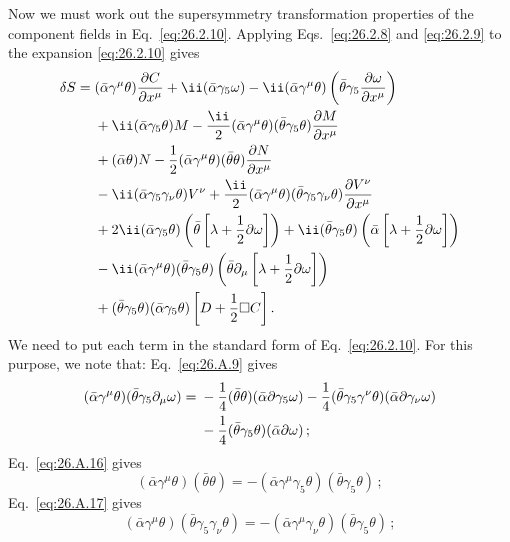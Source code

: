 Now we must work out the supersymmetry transformation properties of the
component fields in Eq.~\eqref{eq:26.2.10}. Applying Eqs.~\eqref{eq:26.2.8}
and \eqref{eq:26.2.9} to the expansion \eqref{eq:26.2.10} gives
\[
  \begin{aligned}
  \delta S={}&(\bar\alpha\gamma^\mu\theta)\frac{\partial C}{\partial x^\mu}
  +\ii(\bar\alpha\gamma_5\omega)
  -\ii(\bar\alpha\gamma^\mu\theta)
    \left(\bar\theta\gamma_5\frac{\partial\omega}{\partial x^\mu}\right)\\
  &+\ii(\bar\alpha\gamma_5\theta)M
  -\frac{\ii}{2}(\bar\alpha\gamma^\mu\theta)(\bar\theta\gamma_5\theta)
    \frac{\partial M}{\partial x^\mu}\\
  &+(\bar\alpha\theta)N
  -\frac{1}{2}(\bar\alpha\gamma^\mu\theta)(\bar\theta\theta)
    \frac{\partial N}{\partial x^\mu}\\
  &-\ii(\bar\alpha\gamma_5\gamma_\nu\theta)V^\nu
  +\frac{\ii}{2}(\bar\alpha\gamma^\mu\theta)
    (\bar\theta\gamma_5\gamma_\nu\theta)
    \frac{\partial V^\nu}{\partial x^\mu}\\
  &+2\ii(\bar\alpha\gamma_5\theta)
    \left(\bar\theta\left[\lambda+\frac{1}{2}\sl{\partial}\omega\right]\right)
  +\ii(\bar\theta\gamma_5\theta)
    \left(\bar\alpha\left[\lambda+\frac{1}{2}\sl{\partial}\omega\right]\right)\\
  &-\ii(\bar\alpha\gamma^\mu\theta)(\bar\theta\gamma_5\theta)
    \left(\bar\theta\partial_\mu
      \left[\lambda+\frac{1}{2}\sl{\partial}\omega\right]\right)\\
  &+(\bar\theta\gamma_5\theta)(\bar\alpha\gamma_5\theta)
    \left[D+\frac{1}{2}\Box C\right].
  \end{aligned}
\]
We need to put each term in the standard form of Eq.~\eqref{eq:26.2.10}. For
this purpose, we note that: Eq.~\eqref{eq:26.A.9} gives
\[
  \begin{aligned}
  (\bar\alpha\gamma^\mu\theta)(\bar\theta\gamma_5\partial_\mu\omega)
  ={}&-\frac14(\bar\theta\theta)
    (\bar\alpha\sl{\partial}\gamma_5\omega)
  -\frac14(\bar\theta\gamma_5\gamma^\nu\theta)
    (\bar\alpha\sl{\partial}\gamma_\nu\omega)\\
  &-\frac14(\bar\theta\gamma_5\theta)
    (\bar\alpha\sl{\partial}\omega)\,;
  \end{aligned}
\]
Eq.~\eqref{eq:26.A.16} gives
\[
  (\bar\alpha\gamma^\mu\theta)(\bar\theta\theta)
  =-(\bar\alpha\gamma^\mu\gamma_5\theta)
    (\bar\theta\gamma_5\theta)\,;
\]
Eq.~\eqref{eq:26.A.17} gives
\[
  (\bar\alpha\gamma^\mu\theta)(\bar\theta\gamma_5\gamma_\nu\theta)
  =-(\bar\alpha\gamma^\mu\gamma_\nu\theta)
    (\bar\theta\gamma_5\theta)\,;
\]
